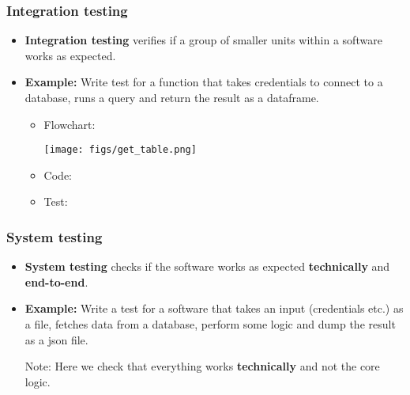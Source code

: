 \documentclass[9pt,xcolor=dvipsnames]{beamer}
\begin{document}
\begin{frame}
  \frametitle{Integration testing}
  \begin{overlayarea}{\textwidth}{\textheight}
  \begin{itemize}
    \item \textbf{Integration testing} verifies if a group of
      smaller units within a software works as expected.
    \item \textbf{Example:} Write test for a function that takes
      credentials to connect to a database, runs a query and return the
      result as a dataframe.
      \begin{itemize}
      \item<only@1> Flowchart:
        \vspace{1cm}
        \begin{center}
          \texttt{[image: figs/get\_table.png]}
        \end{center}
      \item<only@2> Code:
          
        \item<only@3> Test:
          
      \end{itemize}
  \end{itemize}
  \end{overlayarea}
\end{frame}

\begin{frame}
  \frametitle{System testing}
  \begin{overlayarea}{\textwidth}{\textheight}
  \begin{itemize}
    \item \textbf{System testing} checks if the software works as
      expected \textbf{technically} and \textbf{end-to-end}.
    \item \textbf{Example:} Write a test for a software that takes an
      input (credentials etc.) as a file, fetches data from a
      database, perform some logic and dump the result as a json file.
\begin{table}[ht]
  \begin{minipage}[t]{0.45\linewidth} \centering
  \end{minipage}	
  \begin{minipage}[t]{0.35\linewidth}
    \pause
    Note: Here we check that everything works \textbf{technically} and not the
    core logic.
  \end{minipage}	
\end{table}
  \end{itemize}
  \end{overlayarea}
\end{frame}
\end{document}
